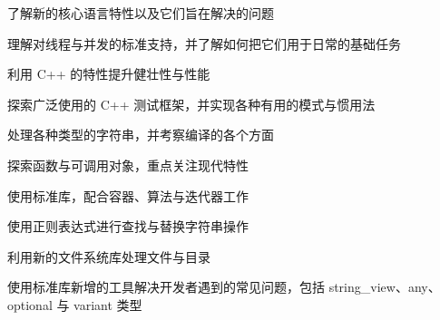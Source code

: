 {\fontsize{10.5bp}{12.6bp}\selectfont
\noindent\hangindent 48bp\hspace*{38.9bp}\textbullet\hspace{5.4bp}%
了解新的核心语言特性以及它们旨在解决的问题\par
\vspace{2.15bp}
\noindent\hangindent 48bp\hspace*{38.9bp}\textbullet\hspace{5.4bp}%
理解对线程与并发的标准支持，并了解如何把它们用于日常的基础任务\par
\vspace{2.15bp}
\noindent\hangindent 48bp\hspace*{38.9bp}\textbullet\hspace{5.4bp}%
利用 C++ 的特性提升健壮性与性能\par
\vspace{2.15bp}
\noindent\hangindent 48bp\hspace*{38.9bp}\textbullet\hspace{5.4bp}%
探索广泛使用的 C++ 测试框架，并实现各种有用的模式与惯用法\par
\vspace{2.15bp}
\noindent\hangindent 48bp\hspace*{38.9bp}\textbullet\hspace{5.4bp}%
处理各种类型的字符串，并考察编译的各个方面\par
\vspace{2.15bp}
\noindent\hangindent 48bp\hspace*{38.9bp}\textbullet\hspace{5.4bp}%
探索函数与可调用对象，重点关注现代特性\par
\vspace{2.15bp}
\noindent\hangindent 48bp\hspace*{38.9bp}\textbullet\hspace{5.4bp}%
使用标准库，配合容器、算法与迭代器工作\par
\vspace{2.15bp}
\noindent\hangindent 48bp\hspace*{38.9bp}\textbullet\hspace{5.4bp}%
使用正则表达式进行查找与替换字符串操作\par
\vspace{2.15bp}
\noindent\hangindent 48bp\hspace*{38.9bp}\textbullet\hspace{5.4bp}%
利用新的文件系统库处理文件与目录\par
\vspace{2.15bp}
\noindent\hangindent 48bp\hspace*{38.9bp}\textbullet\hspace{5.4bp}%
使用标准库新增的工具解决开发者遇到的常见问题，包括 string\_view、any、optional 与 variant 类型\par}
\endgroup


